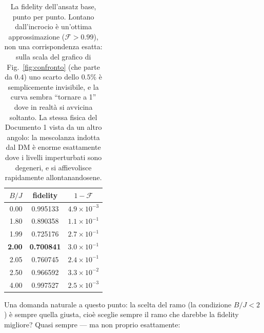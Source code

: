 \documentclass[11pt,a4paper]{article}
\begin{document}
\begin{table}[htbp]
\centering
\small
\renewcommand{\arraystretch}{1.25}
\begin{tabular}{@{}rcc@{}}
\toprule
\rowcolor{grigetto}
$B/J$ & fidelity & $1-\mathcal F$ \\
\midrule
0.00 & 0.995133 & $4.9\times10^{-3}$ \\
1.80 & 0.890358 & $1.1\times10^{-1}$ \\
1.99 & 0.725176 & $2.7\times10^{-1}$ \\
\textbf{2.00} & \textbf{0.700841} & $3.0\times10^{-1}$ \\
2.05 & 0.760745 & $2.4\times10^{-1}$ \\
2.50 & 0.966592 & $3.3\times10^{-2}$ \\
4.00 & 0.997527 & $2.5\times10^{-3}$ \\
\bottomrule
\end{tabular}
\caption{La fidelity dell'ansatz base, punto per punto. Lontano
dall'incrocio è un'ottima approssimazione ($\mathcal F>0.99$), non una
corrispondenza esatta: sulla scala del grafico di Fig.~\ref{fig:confronto}
(che parte da $0.4$) uno scarto dello $0.5\%$ è semplicemente invisibile, e la
curva sembra ``tornare a 1'' dove in realtà si avvicina soltanto. La stessa
fisica del Documento 1 vista da un altro angolo: la mescolanza indotta dal DM è
enorme esattamente dove i livelli imperturbati sono degeneri, e si affievolisce
rapidamente allontanandosene.}
\label{tab:fidelity-branch}
\end{table}

\FloatBarrier

Una domanda naturale a questo punto: la scelta del ramo (la condizione
$B/J<2$) è sempre quella giusta, cioè sceglie sempre il ramo che darebbe la
fidelity migliore? Quasi sempre --- ma non proprio esattamente:
\end{document}
